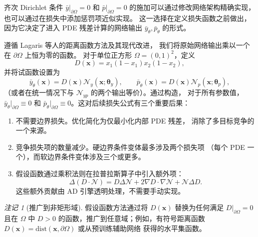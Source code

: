 \documentclass{xmu}
\theoremstyle{plain}
\theoremstyle{remark}
\newtheorem{remark}[theorem]{注记}
\begin{document}
\label{subsec:bc-handling}

齐次 Dirichlet 条件 $\bar y|_{\partial\Omega}=0$ 和 $\bar p|_{\partial\Omega}=0$
的施加可以通过修改网络架构精确实现，也可以通过在损失中添加惩罚项近似实现。
这一选择在定义损失函数之前做出，因为它决定了进入 PDE 残差计算的网络输出
$\bar y_\theta,\bar p_\theta$ 的形式。

\label{subsubsec:hard-bc}
遵循 Lagaris 等人\cite{23}的距离函数方法及其现代改进\cite{24,16}，
我们将原始网络输出乘以一个在 $\partial\Omega$ 上恒为零的函数。
对于单位正方形 $\Omega=(0,1)^2$，定义
\begin{equation}
D(\mathbf{x}) = x_1(1-x_1)x_2(1-x_2),
\end{equation}
并将试函数设置为
\begin{equation}
\bar y_\theta(\mathbf{x}) = D(\mathbf{x})\mathcal{N}_y(\mathbf{x};\boldsymbol{\theta}_y),
\qquad
\bar p_\theta(\mathbf{x}) = D(\mathbf{x})\mathcal{N}_p(\mathbf{x};\boldsymbol{\theta}_p),
\end{equation}
（或者在统一情况下与 $\mathcal{N}_{yp}$ 的两个输出等价）。通过构造，
对于所有参数值，$\bar y_\theta|_{\partial\Omega}\equiv 0$ 和
$\bar p_\theta|_{\partial\Omega}\equiv 0$。这对后续损失公式有三个重要后果：

\begin{enumerate}[label=\arabic*.]
\item 不需要边界损失。优化简化为仅最小化内部 PDE 残差，
      消除了多目标竞争的一个来源。
\item 竞争损失项的数量减少。硬边界条件变体最多涉及两个损失项
      （每个 PDE 一个），而软边界条件变体涉及三个或更多。
\item 假设函数通过乘积法则在拉普拉斯算子中引入额外项：
      \begin{equation}
      \Delta(D\cdot\mathcal{N}) = D\Delta\mathcal{N}+2\nabla D\cdot\nabla\mathcal{N}+\mathcal{N}\Delta D.
      \end{equation}
      这些额外贡献由 AD 引擎透明处理，不需要手动实现。
\end{enumerate}

\begin{remark}[推广到非矩形域]
假设函数方法通过将 $D(\mathbf{x})$ 替换为任何满足 $D|_{\partial\Omega}=0$
且在 $\Omega$ 中 $D>0$ 的函数，推广到任意域；例如，有符号距离函数
$D(\mathbf{x})=\mathrm{dist}(\mathbf{x},\partial\Omega)$ 或从预训练辅助网络
获得的水平集函数\cite{24}。
\end{remark}
\end{document}
